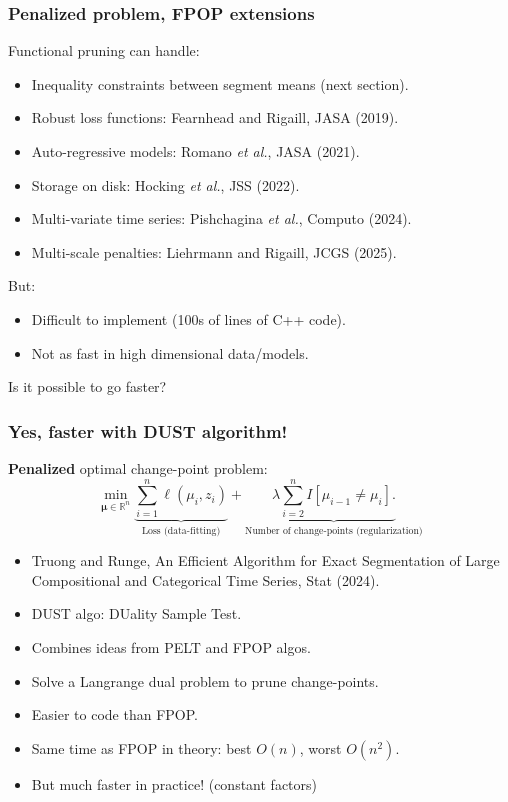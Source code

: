 \documentclass{beamer}
\newcommand{\RR}{\mathbb R}
\begin{document}
\begin{frame}
  \frametitle{Penalized problem, FPOP extensions}
Functional pruning can handle:
\begin{itemize}
\item Inequality constraints between segment means (next section).
\item Robust loss functions: Fearnhead and Rigaill,
  JASA (2019).
\item Auto-regressive models: Romano \emph{et al.},
  JASA (2021).
\item Storage on disk: Hocking \emph{et al.}, JSS (2022).
\item Multi-variate time series: Pishchagina \emph{et al.},
  Computo (2024).
\item Multi-scale penalties: Liehrmann and Rigaill, JCGS (2025).
\end{itemize}
But:
\begin{itemize}
\item Difficult to implement (100s of lines of C++ code).
\item Not as fast in high dimensional data/models.
\end{itemize}
Is it possible to go faster?
\end{frame}

\begin{frame}
  \frametitle{Yes, faster with DUST algorithm!}
  \textbf{Penalized} optimal change-point problem:
$$
\min_{
  \mathbf \mu\in\RR^{n}
}
\underbrace{\sum_{i=1}^{n} \ell( \mu_i,  z_i)}_{\text{Loss (data-fitting)}} + \underbrace{\lambda\sum_{i=2}^n I[\mu_{i-1}\neq \mu_i].}_{\text{Number of change-points (regularization)}}
$$
\begin{itemize}
\item Truong and Runge, An Efficient Algorithm for Exact
  Segmentation of Large Compositional and Categorical Time Series,
  Stat (2024).
\item DUST algo: DUality Sample Test.
\item Combines ideas from PELT and FPOP algos.
\item Solve a Langrange dual problem to prune change-points.
\item Easier to code than FPOP.
\item Same time as FPOP in theory: best $O(n)$, worst $O(n^2)$.
\item But much faster in practice! (constant factors)
\end{itemize}
\end{frame}
\end{document}
